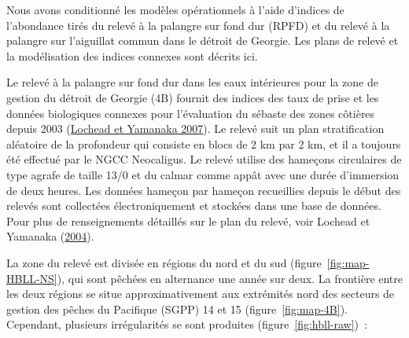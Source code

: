 \documentclass[french,11pt]{book}
\begin{document}
Nous avons conditionné les modèles opérationnels à l'aide d'indices de l'abondance tirés du relevé à la palangre sur fond dur (RPFD) et du relevé à la palangre sur l'aiguillat commun dans le détroit de Georgie. Les plans de relevé et la modélisation des indices connexes sont décrits ici.

\hypertarget{sec:hbll-index-data}{%
\label{sec:hbll-index-data}}

Le relevé à la palangre sur fond dur dans les eaux intérieures pour la zone de gestion du détroit de Georgie (4B) fournit des indices des taux de prise et les données biologiques connexes pour l'évaluation du sébaste des zones côtières depuis 2003 (\protect\hyperlink{ref-lochead2007}{Lochead et Yamanaka 2007}). Le relevé suit un plan stratification aléatoire de la profondeur qui consiste en blocs de 2 km par 2 km, et il a toujours été effectué par le NGCC Neocaligus. Le relevé utilise des hameçons circulaires de type agrafe de taille 13/0 et du calmar comme appât avec une durée d'immersion de deux heures. Les données hameçon par hameçon recueillies depuis le début des relevés sont collectées électroniquement et stockées dans une base de données. Pour plus de renseignements détaillés sur le plan du relevé, voir Lochead et Yamanaka (\protect\hyperlink{ref-lochead2004}{2004}).

La zone du relevé est divisée en régions du nord et du sud (figure~\ref{fig:map-HBLL-NS}), qui sont pêchées en alternance une année sur deux. La frontière entre les deux régions se situe approximativement aux extrémités nord des secteurs de gestion des pêches du Pacifique (SGPP) 14 et 15 (figure~\ref{fig:map-4B}). Cependant, plusieurs irrégularités se sont produites (figure~\ref{fig:hbll-raw})~:
\end{document}
